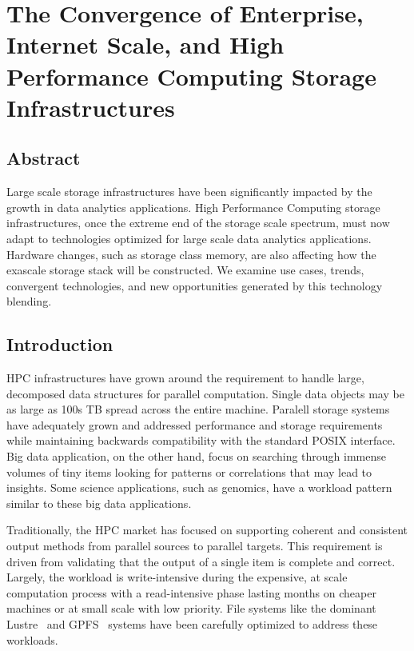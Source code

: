 

\chapter{The Convergence of Enterprise, Internet Scale, and High Performance Computing Storage Infrastructures}

\section*{Abstract}
Large scale storage infrastructures have been significantly impacted by the
growth in data analytics applications. High Performance Computing storage
infrastructures, once the extreme end of the storage scale spectrum, must now
adapt to technologies optimized for large scale data analytics applications.
Hardware changes, such as storage class memory, are also affecting how
the exascale storage stack will be constructed. We examine use cases, trends,
convergent technologies, and new opportunities generated by this technology
blending.

\section{Introduction}\label{sec:intro}
HPC infrastructures have grown around the requirement to handle large,
decomposed data structures for parallel computation. Single data objects may be
as large as 100s TB spread across the entire machine. Paralell storage systems
have adequately grown and addressed performance and storage requirements while
maintaining backwards compatibility with the standard POSIX interface.  Big
data application, on the other hand, focus on searching through immense volumes
of tiny items looking for patterns or correlations that may lead to insights.
Some science applications, such as genomics, have a workload pattern similar to
these big data applications.

Traditionally, the HPC market has focused on supporting coherent and consistent
output methods from parallel sources to parallel targets. This requirement is
driven from validating that the output of a single item is complete and
correct. Largely, the workload is write-intensive during the expensive, at
scale computation process with a read-intensive phase lasting months on cheaper
machines or at small scale with low priority. File systems like the dominant
Lustre~\cite{lustre} and GPFS~\cite{gpfs} systems have been carefully optimized
to address these workloads.

